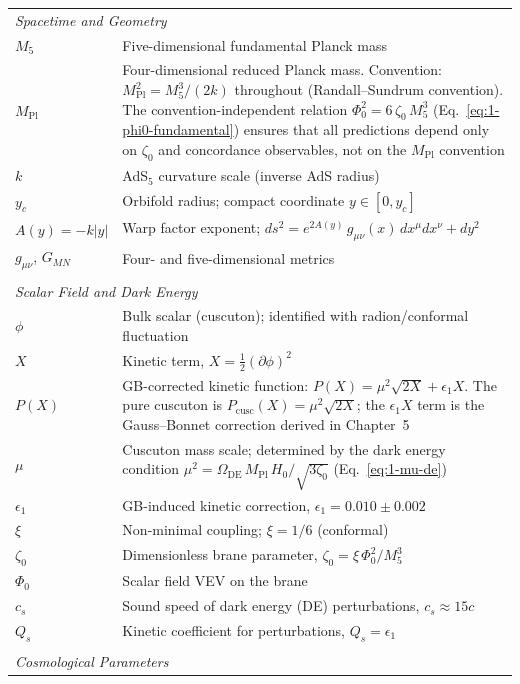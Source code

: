 \documentclass[10pt,a4paper,openany,twocolumn]{book}
\theoremstyle{definition}
\theoremstyle{remark}
\begin{document}
\begin{longtable}{l p{10cm}}
\multicolumn{2}{l}{\textit{Spacetime and Geometry}} \\
$M_5$ & Five-dimensional fundamental Planck mass \\
$M_{\mathrm{Pl}}$ & Four-dimensional reduced Planck mass. Convention: $M_{\mathrm{Pl}}^2 = M_5^3/(2k)$ throughout (Randall--Sundrum convention). The convention-independent relation $\Phi_0^2 = 6\,\zeta_0\,M_5^3$ (Eq.~\eqref{eq:1-phi0-fundamental}) ensures that all predictions depend only on $\zeta_0$ and concordance observables, not on the $M_{\mathrm{Pl}}$ convention \\
$k$ & AdS$_5$ curvature scale (inverse AdS radius) \\
$y_c$ & Orbifold radius; compact coordinate $y \in [0, y_c]$ \\
$A(y) = -k|y|$ & Warp factor exponent; $ds^2 = e^{2A(y)}\, g_{\mu\nu}(x)\, dx^\mu dx^\nu + dy^2$ \\
$g_{\mu\nu}$, $G_{MN}$ & Four- and five-dimensional metrics \\
\\
\multicolumn{2}{l}{\textit{Scalar Field and Dark Energy}} \\
$\phi$ & Bulk scalar (cuscuton); identified with radion/conformal fluctuation \\
$X$ & Kinetic term, $X = \tfrac{1}{2}(\partial\phi)^2$ \\
$P(X)$ & GB-corrected kinetic function: $P(X) = \mu^2\sqrt{2X} + \epsilon_1 X$. The pure cuscuton is $P_{\mathrm{cusc}}(X) = \mu^2\sqrt{2X}$; the $\epsilon_1 X$ term is the Gauss--Bonnet correction derived in Chapter~5 \\
$\mu$ & Cuscuton mass scale; determined by the dark energy condition $\mu^2 = \Omega_{\mathrm{DE}}\, M_{\mathrm{Pl}}\, H_0/\sqrt{3\zeta_0}$ (Eq.~\ref{eq:1-mu-de}) \\
$\epsilon_1$ & GB-induced kinetic correction, $\epsilon_1 = 0.010 \pm 0.002$ \\
$\xi$ & Non-minimal coupling; $\xi = 1/6$ (conformal) \\
$\zeta_0$ & Dimensionless brane parameter, $\zeta_0 = \xi\,\Phi_0^2/M_5^3$ \\
$\Phi_0$ & Scalar field VEV on the brane \\
$c_s$ & Sound speed of dark energy (DE) perturbations, $c_s \approx 15c$ \\
$Q_s$ & Kinetic coefficient for perturbations, $Q_s = \epsilon_1$ \\
\\
\multicolumn{2}{l}{\textit{Cosmological Parameters}} \\

\end{longtable}
\end{document}
